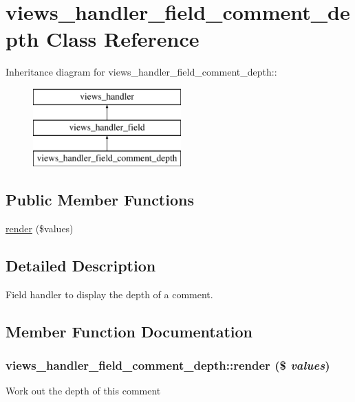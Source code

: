 \hypertarget{classviews__handler__field__comment__depth}{
\section{views\_\-handler\_\-field\_\-comment\_\-depth Class Reference}
\label{classviews__handler__field__comment__depth}
}
Inheritance diagram for views\_\-handler\_\-field\_\-comment\_\-depth::\begin{figure}[H]
\begin{center}
\leavevmode
\includegraphics[height=3cm]{classviews__handler__field__comment__depth}
\end{center}
\end{figure}
\subsection*{Public Member Functions}
\begin{DoxyCompactItemize}
\item 
\hyperlink{classviews__handler__field__comment__depth_a02940dec9e78bd8e054f4c1b0f3159a9}{render} (\$values)
\end{DoxyCompactItemize}


\subsection{Detailed Description}
Field handler to display the depth of a comment. 

\subsection{Member Function Documentation}
\hypertarget{classviews__handler__field__comment__depth_a02940dec9e78bd8e054f4c1b0f3159a9}{
\subsubsection[{render}]{\setlength{\rightskip}{0pt plus 5cm}views\_\-handler\_\-field\_\-comment\_\-depth::render (\$ {\em values})}}
\label{classviews__handler__field__comment__depth_a02940dec9e78bd8e054f4c1b0f3159a9}
Work out the depth of this comment 

